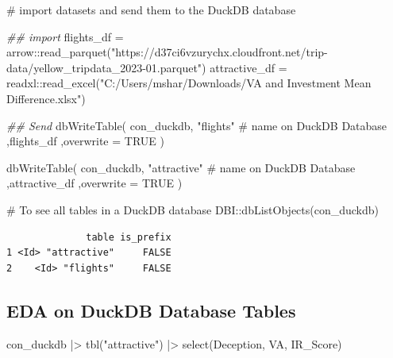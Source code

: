 \documentclass[
  letterpaper,
  DIV=11,
  numbers=noendperiod]{scrreprt}
\newenvironment{Shaded}{\begin{snugshade}}{\end{snugshade}}
\newcommand{\AttributeTok}[1]{\textcolor[rgb]{0.40,0.45,0.13}{#1}}
\newcommand{\CommentTok}[1]{\textcolor[rgb]{0.37,0.37,0.37}{#1}}
\newcommand{\ConstantTok}[1]{\textcolor[rgb]{0.56,0.35,0.01}{#1}}
\newcommand{\DocumentationTok}[1]{\textcolor[rgb]{0.37,0.37,0.37}{\textit{#1}}}
\newcommand{\FunctionTok}[1]{\textcolor[rgb]{0.28,0.35,0.67}{#1}}
\newcommand{\NormalTok}[1]{\textcolor[rgb]{0.00,0.23,0.31}{#1}}
\newcommand{\OtherTok}[1]{\textcolor[rgb]{0.00,0.23,0.31}{#1}}
\newcommand{\SpecialCharTok}[1]{\textcolor[rgb]{0.37,0.37,0.37}{#1}}
\newcommand{\StringTok}[1]{\textcolor[rgb]{0.13,0.47,0.30}{#1}}
\begin{document}
\begin{Shaded}
\begin{Highlighting}[]
\CommentTok{\# import datasets and send them to the DuckDB database}

\DocumentationTok{\#\# import}
\NormalTok{flights\_df }\OtherTok{=}\NormalTok{ arrow}\SpecialCharTok{::}\FunctionTok{read\_parquet}\NormalTok{(}\StringTok{"https://d37ci6vzurychx.cloudfront.net/trip{-}data/yellow\_tripdata\_2023{-}01.parquet"}\NormalTok{)}
\NormalTok{attractive\_df }\OtherTok{=}\NormalTok{ readxl}\SpecialCharTok{::}\FunctionTok{read\_excel}\NormalTok{(}\StringTok{"C:/Users/mshar/Downloads/VA and Investment Mean Difference.xlsx"}\NormalTok{)}

\DocumentationTok{\#\# Send }
\FunctionTok{dbWriteTable}\NormalTok{(}
\NormalTok{  con\_duckdb, }
  \StringTok{"flights"} \CommentTok{\# name on DuckDB Database}
\NormalTok{  ,flights\_df}
\NormalTok{  ,}\AttributeTok{overwrite =} \ConstantTok{TRUE}
\NormalTok{)}

\FunctionTok{dbWriteTable}\NormalTok{(}
\NormalTok{  con\_duckdb, }
  \StringTok{"attractive"} \CommentTok{\# name on DuckDB Database}
\NormalTok{  ,attractive\_df}
\NormalTok{  ,}\AttributeTok{overwrite =} \ConstantTok{TRUE}
\NormalTok{)}
\end{Highlighting}
\end{Shaded}

\begin{Shaded}
\begin{Highlighting}[]
\CommentTok{\# To see all tables in a DuckDB database}
\NormalTok{DBI}\SpecialCharTok{::}\FunctionTok{dbListObjects}\NormalTok{(con\_duckdb)}
\end{Highlighting}
\end{Shaded}

\begin{verbatim}
              table is_prefix
1 <Id> "attractive"     FALSE
2    <Id> "flights"     FALSE
\end{verbatim}

\subsection{EDA on DuckDB Database
Tables}\label{eda-on-duckdb-database-tables}

\begin{Shaded}
\begin{Highlighting}[]
\NormalTok{con\_duckdb }\SpecialCharTok{|\textgreater{}} 
  \FunctionTok{tbl}\NormalTok{(}\StringTok{"attractive"}\NormalTok{) }\SpecialCharTok{|\textgreater{}} 
  \FunctionTok{select}\NormalTok{(Deception, VA, IR\_Score)}
\end{Highlighting}
\end{Shaded}
\end{document}
